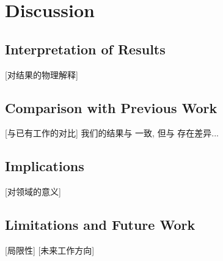 
\section{Discussion}
\label{sec:discussion}

\subsection{Interpretation of Results}
[对结果的物理解释]

\subsection{Comparison with Previous Work}
[与已有工作的对比]
我们的结果与 \citet{ref1} 一致, 但与 \citet{ref2} 存在差异...

\subsection{Implications}
[对领域的意义]

\subsection{Limitations and Future Work}
[局限性]
[未来工作方向]
